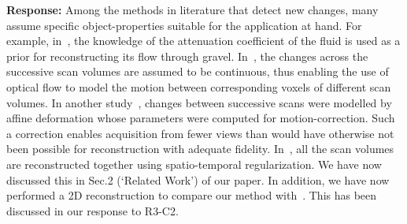 \documentclass{article}
\begin{document}
\textbf{Response:} Among the methods in literature that detect new changes, many assume specific object-properties suitable for the application at hand.  For example, in~\cite{Van2015}, the knowledge of the attenuation coefficient of the fluid is used as a prior for reconstructing its flow through gravel. In~\cite{koen2020}, the changes across the successive scan volumes are assumed to be continuous, thus enabling the use of optical flow to model the motion between corresponding voxels of different scan volumes. In another study~\cite{vincent2017}, changes between successive scans were modelled by affine deformation whose parameters were computed for motion-correction. Such a correction enables acquisition from fewer views than would have otherwise not been possible for reconstruction with adequate fidelity. In~\cite{daniil2015}, all the scan volumes are reconstructed together using spatio-temporal regularization. We have now discussed this in Sec.2 (`Related Work') of our paper.
In addition, we have now performed a 2D reconstruction to compare our method with~\cite{Lee2012}. This has been discussed in our response to R3-C2.\\


\end{document}
